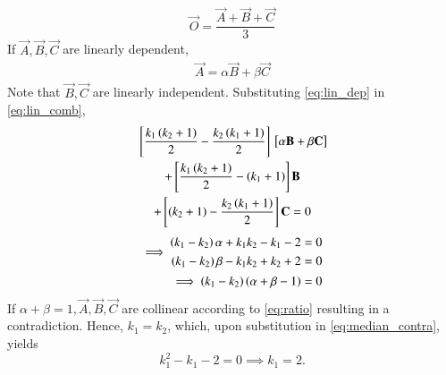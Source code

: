 \documentclass[journal,12pt,twocolumn]{IEEEtran}
\renewcommand\thesection{\arabic{section}}
\begin{document}
\begin{enumerate}[label=\thesection.\arabic*
,ref=\thesection.\theenumi]
\begin{equation}
\vec{O} = \frac{\vec{A}+\vec{B}+\vec{C}}{3}
\end{equation}
%
If $\vec{A},\vec{B},\vec{C}$ are linearly dependent,
\begin{align}
\label{eq:lin_dep}
\vec{A} = \alpha \vec{B} + \beta \vec{C} 
\end{align}
%
Note that $\vec{B},\vec{C}$ are linearly independent.
Substituting \eqref{eq:lin_dep} in \eqref{eq:lin_comb},
\begin{multline}
 {}\left[\frac{k_1\left(k_2+1\right)}{2}
-\frac{k_2\left(k_1+1\right)}{2}\right]{}\left[\alpha \mathbf{B} + \beta \mathbf{C}  \right]
\\
+ 
{}\left[\frac{k_1\left(k_2+1\right)}{2}-\left(k_1+1\right)\right]\mathbf{B} 
\\
+ {}\left[\left(k_2+1\right)-\frac{k_2\left(k_1+1\right)}{2}\right]\mathbf{C} 
= 0
\end{multline}
\begin{align}
\implies
\begin{split}
\left(k_1-k_2\right)\alpha + k_1k_2 - k_1-2 &=0
\\
\left(k_1-k_2\right)\beta - k_1k_2 + k_2+2 &=0
\end{split}
\label{eq:median_contra}
\\
\implies \left(k_1-k_2\right)\left(\alpha +\beta - 1\right) = 0
\end{align}
If $\alpha+\beta = 1, \vec{A},\vec{B},\vec{C}$ are collinear according to \eqref{eq:ratio} resulting in a 
contradiction.  Hence, $k_1=k_2$, which, upon substitution in \eqref{eq:median_contra}, yields
\begin{equation}
k_1^2 - k_1-2 = 0 \implies k_1 = 2.
\end{equation}
\end{enumerate}
%
\end{document}
